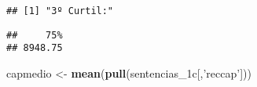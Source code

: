 \documentclass[runningheads,a4paper]{llncs}
\newenvironment{Shaded}{}{}
\newcommand{\KeywordTok}[1]{\textcolor[rgb]{0.00,0.44,0.13}{\textbf{{#1}}}}
\newcommand{\DecValTok}[1]{\textcolor[rgb]{0.25,0.63,0.44}{{#1}}}
\newcommand{\StringTok}[1]{\textcolor[rgb]{0.25,0.44,0.63}{{#1}}}
\newcommand{\NormalTok}[1]{{#1}}
\newcommand{\OperatorTok}[1]{\textcolor[rgb]{0.40,0.40,0.40}{{#1}}}
\begin{document}
\begin{verbatim}
## [1] "3º Curtil:"
\end{verbatim}

\begin{Shaded}
\end{Shaded}

\begin{verbatim}
##     75% 
## 8948.75
\end{verbatim}

\begin{Shaded}
\begin{Highlighting}[]
\NormalTok{capmedio <-}\StringTok{ }\KeywordTok{mean}\NormalTok{(}\KeywordTok{pull}\NormalTok{(sentencias_1c[,}\StringTok{'reccap'}\NormalTok{]))}


\end{Highlighting}
\end{Shaded}
\end{document}
